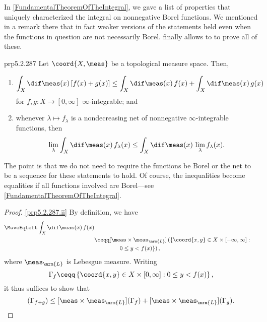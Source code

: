In \cref{FundamentalTheoremOfTheIntegral}, we gave a list of properties that uniquely characterized the integral on nonnegative Borel functions.  We mentioned in a remark there that in fact weaker versions of the statements held even when the functions in question are not necessarily Borel.   finally allows to to prove all of these.
\begin{thm}{}{prp5.2.287}
Let $\coord{X,\meas}$ be a topological measure space.  Then,
\begin{enumerate}
\item \label{prp5.2.287.ii}
\begin{equation}
\int _X\dif \meas (x)\, [f(x)+g(x)]\leq \int _X\dif \meas (x)\, f(x)+\int _X\dif \meas (x)\, g(x)
\end{equation}
for $f,g\colon X\rightarrow [0,\infty ]$ $\infty$-integrable; and
\item \label{prp5.2.287.iv}whenever $\lambda \mapsto f_{\lambda}$ is a nondecreasing net of nonnegative $\infty$-integrable functions, then
\begin{equation}
\lim _{\lambda}\int _X\dif \meas (x)\, f_{\lambda}(x)\leq \int _X\dif \meas (x)\, \lim _{\lambda}f_{\lambda}(x).
\end{equation}
\end{enumerate}
\begin{rmk}
The point is that we do not need to require the functions be Borel or the net to be a sequence for these statements to hold.  Of course, the inequalities become equalities if all functions involved are Borel---see \cref{FundamentalTheoremOfTheIntegral}.
\end{rmk}
\begin{proof}
\cref{prp5.2.287.ii} By definition, we have
\begin{equation}
\begin{split}
\MoveEqLeft
\int _X\dif \meas (x)\, f(x) \\
& \ceqq [\meas \times \meas _{\mrm{L}}]\left( \left\{ \coord{x,y}\in X\times [-\infty ,\infty ]:\right. \right. \\ & \qquad \qquad \left. \left. 0\leq y<f(x)\right\} \right) ,
\end{split}
\end{equation}
where $\meas _{\mrm{L}}$ is Lebesgue measure.  Writing
\begin{equation}
\Gamma _f\ceqq \left\{ \coord{x,y}\in X\times [0,\infty ]:0\leq y<f(x)\right\} ,
\end{equation}
it thus suffices to show that
\begin{equation}
[\meas \times \meas _{\mrm{L}}](\Gamma _{f+g})\leq [\meas \times \meas _{\mrm{L}}](\Gamma _f)+[\meas \times \meas _{\mrm{L}}](\Gamma _g).
\end{equation}


\end{proof}
\end{thm}
